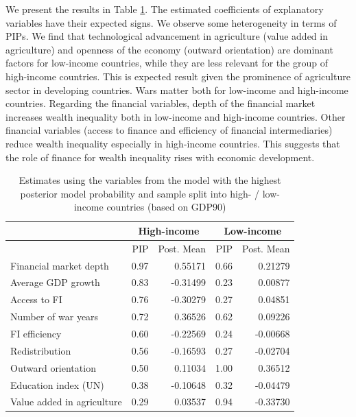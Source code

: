 \begin{refsection}
We present the results in Table \ref{ch3tab:inc_comparison}. The estimated coefficients of explanatory variables have their expected signs. We observe some heterogeneity in terms of \acp{PIP}. We find that technological advancement in agriculture (value added in agriculture) and openness of the economy (outward orientation) are dominant factors for low-income countries, while they are less relevant for the group of high-income countries. This is expected result given the prominence of agriculture sector in developing countries. Wars matter both for low-income and high-income countries. Regarding the financial variables, depth of the financial market increases wealth inequality both in low-income and high-income countries. Other financial variables (access to finance and efficiency of financial intermediaries) reduce wealth inequality especially in high-income countries. This suggests that the role of finance for wealth inequality rises with economic development.  

\begin{table}[htbp!]
\caption{Estimates using the variables from the model with the highest posterior model probability and sample split into high- / low- income countries (based on GDP90)}
\label{ch3tab:inc_comparison}
\centering
\begin{tabular}{lrrrr}
  \toprule
  & \multicolumn{2}{c}{High-income} & \multicolumn{2}{c}{Low-income} \\
  \midrule
	 & \ac{PIP} & Post. Mean & \ac{PIP} & Post. Mean \\ 
  \midrule
  Financial market depth & 0.97 & 0.55171 & 0.66 & 0.21279 \\ 
  Average GDP growth & 0.83 & -0.31499 & 0.23 & 0.00877 \\ 
  Access to FI & 0.76 & -0.30279 & 0.27 & 0.04851 \\ 
  Number of war years & 0.72 & 0.36526 & 0.62 & 0.09226 \\ 
  FI efficiency & 0.60 & -0.22569 & 0.24 & -0.00668 \\ 
  Redistribution & 0.56 & -0.16593 & 0.27 & -0.02704 \\ 
  Outward orientation & 0.50 & 0.11034 & 1.00 & 0.36512 \\ 
  Education index (UN) & 0.38 & -0.10648 & 0.32 & -0.04479 \\ 
  Value added in agriculture & 0.29 & 0.03537 & 0.94 & -0.33730 \\ 
   \bottomrule
\end{tabular}
\end{table}


\end{refsection}
